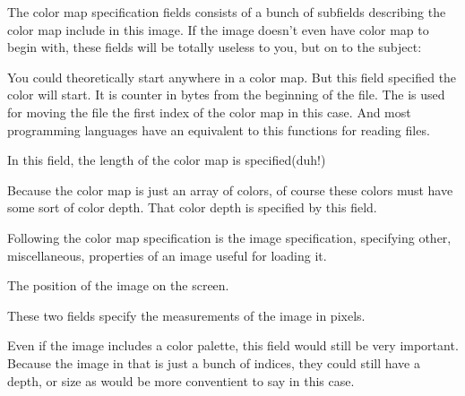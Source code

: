 \begin{refsection}

  The color map specification fields consists of a bunch of subfields
  describing the color map include in this image. If the image doesn't
  even have color map to begin with, these fields will be totally
  useless to you, but on to the subject:


  You could theoretically start anywhere in a color map. But this
  field specified the color will start. It is counter in bytes from
  the beginning of the file. The  is used for moving
  the file the first index of the color map in this case. And most
  programming languages have an equivalent to this functions for
  reading files.


  In this field, the length of the color map is specified(duh!)


  Because the color map is just an array of colors, of course these
  colors must have some sort of color depth. That color depth is
  specified by this field.


  Following the color map specification is the image specification,
  specifying other, miscellaneous, properties of an image useful for
  loading it.



  The position of the image on the screen.



  These two fields specify the measurements of the image in pixels.


  Even if the image includes a color palette, this field would still
  be very important. Because the image in that is just a bunch of
  indices, they could still have a depth, or size as would be more
  conventient to say in this case.


\end{refsection}

